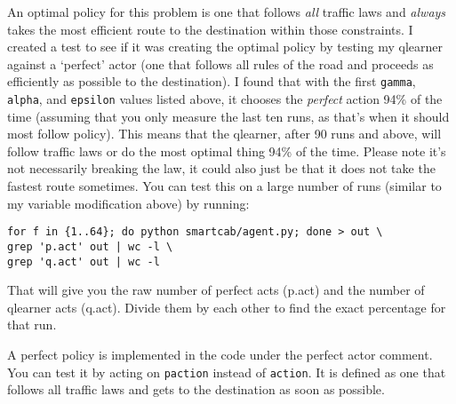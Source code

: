 \documentclass[11pt]{article}
\begin{document}
An optimal policy for this problem is one that follows \emph{all} traffic laws and \emph{always} takes the most efficient route to the destination within those constraints. I created a test to see if it was creating the optimal policy by testing my qlearner against a `perfect' actor (one that follows all rules of the road and proceeds as efficiently as possible to the destination). I found that with the first \texttt{gamma}, \texttt{alpha}, and \texttt{epsilon} values listed above, it chooses the \emph{perfect} action 94\% of the time (assuming that you only measure the last ten runs, as that's when it should most follow policy). This means that the qlearner, after 90 runs and above, will follow traffic laws or do the most optimal thing 94\% of the time. Please note it's not necessarily breaking the law, it could also just be that it does not take the fastest route sometimes. You can test this on a large number of runs (similar to my variable modification above) by running:

\begin{lstlisting}
for f in {1..64}; do python smartcab/agent.py; done > out \
grep 'p.act' out | wc -l \
grep 'q.act' out | wc -l
\end{lstlisting}

That will give you the raw number of perfect acts (p.act) and the number of qlearner acts (q.act). Divide them by each other to find the exact percentage for that run.

A perfect policy is implemented in the code under the perfect actor comment. You can test it by acting on \texttt{paction} instead of \texttt{action}. It is defined as one that follows all traffic laws and gets to the destination as soon as possible.
\end{document}
